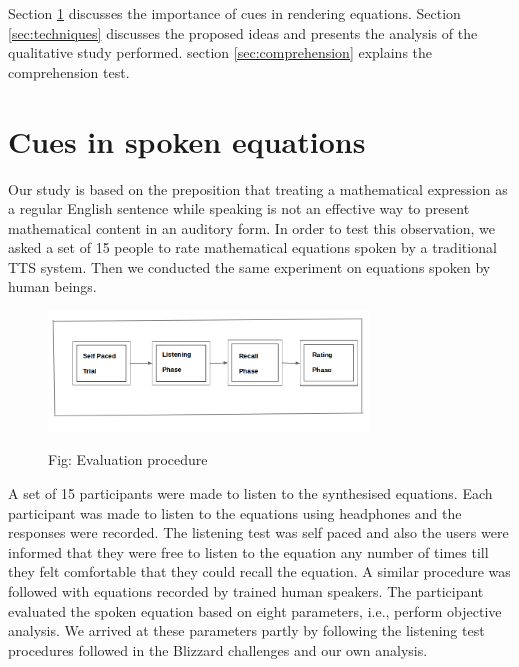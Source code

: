 \documentclass{article}
\begin{document}
Section \ref{sec:cues} discusses the importance of cues in rendering equations. Section \ref{sec:techniques} discusses the proposed ideas and presents the analysis of the qualitative study performed. section \ref{sec:comprehension} explains the comprehension test.

\section{Cues in spoken equations}
\label{sec:cues}

Our study is based on the preposition that treating a mathematical expression as a regular English sentence while speaking is not an effective way to present mathematical content in an auditory form. In order to test this observation, we asked a set of 15 people to rate mathematical equations spoken by a traditional TTS system.  Then we conducted the same experiment on equations spoken by human beings. 


\begin{figure}[h]
\label{fig:eval}

\begin{minipage}[b]{1.0\linewidth}
  \centering
  
  \centerline{\includegraphics[width=8.5cm]{eval}}
 
  \centerline{Fig: Evaluation procedure}\medskip
\end{minipage}
\end{figure}

A set of 15 participants were made to listen to the synthesised equations. Each participant was made to listen to the equations using headphones and the responses were recorded. The listening test was self paced and also the users were informed that they were free to listen to the equation any number of times till they felt comfortable that they could recall the equation.  A similar procedure was followed with equations recorded by trained human speakers. The participant  evaluated the spoken equation based on eight parameters, i.e., perform objective analysis. We arrived at these parameters partly by following the listening test procedures followed in the Blizzard challenges \cite{hinterleitner2011evaluation} and our own analysis.
\end{document}
